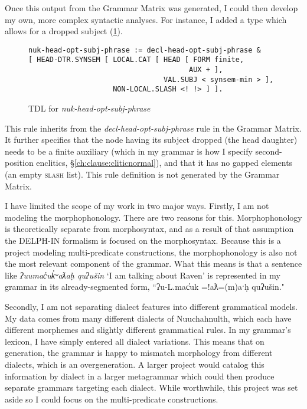 Once this output from the Grammar Matrix was generated, I could then develop my own, more complex syntactic analyses. For instance, I added a type which allows for a dropped subject (\cref{figure:nuk-head-opt-subj-phrase}).

\begin{figure}[H]
\caption{TDL for \textit{nuk-head-opt-subj-phrase}}
\label{figure:nuk-head-opt-subj-phrase}
\begin{verbatim}
nuk-head-opt-subj-phrase := decl-head-opt-subj-phrase &
[ HEAD-DTR.SYNSEM [ LOCAL.CAT [ HEAD [ FORM finite,
                                      AUX + ],
                                VAL.SUBJ < synsem-min > ],
                    NON-LOCAL.SLASH <! !> ] ].
\end{verbatim}
\end{figure}

\vspace{-5pt}

\noindent This rule inherits from the \textit{decl-head-opt-subj-phrase} rule in the Grammar Matrix. It further specifies that the node having its subject dropped (the head daughter) needs to be a finite auxiliary (which in my grammar is how I specify second-position enclitics, \S\ref{ch:clause:cliticnormal}), and that it has no gapped elements (an empty \textsc{slash} list). This rule definition is not generated by the Grammar Matrix.

I have limited the scope of my work in two major ways. Firstly, I am not modeling the morphophonology. There are two reasons for this. Morphophonology is theoretically separate from morphosyntax, and as a result of that assumption the DELPH-IN formalism is focused on the morphosyntax. Because this is a project modeling multi-predicate constructions, the morphophonology is also not the most relevant component of the grammar. What this means is that a sentence like \textit{ʔuumac̓uk̓ʷaƛaḥ quʔušin} `I am talking about Raven' is represented in my grammar in its already-segmented form, ``ʔu-L.mac̓uk =!aƛ=(m)aˑḥ quʔušin."

Secondly, I am not separating dialect features into different grammatical models. My data comes from many different dialects of Nuuchahnulth, which each have different morphemes and slightly different grammatical rules. In my grammar's lexicon, I have simply entered all dialect variations. This means that on generation, the grammar is happy to mismatch morphology from different dialects, which is an overgeneration. A larger project would catalog this information by dialect in a larger metagrammar which could then produce separate grammars targeting each dialect. While worthwhile, this project was set aside so I could focus on the multi-predicate constructions.

